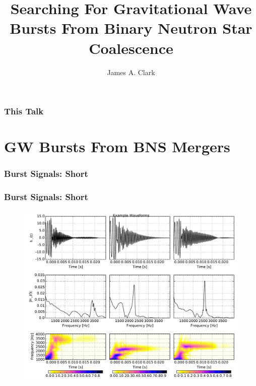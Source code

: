 \documentclass[serif,mathserif]{beamer}
\begin{document}

\title[BNS Bursts]{Searching For Gravitational Wave Bursts From
Binary Neutron Star Coalescence}
\author{James A. Clark}
\date{} 


\begin{frame}[plain]
\titlepage
\end{frame}

\begin{frame}
    \frametitle{This Talk}
    \tableofcontents
\end{frame} 

\section{GW Bursts From BNS Mergers}

\begin{frame}
    \frametitle{Burst Signals: Short}
\end{frame}

\begin{frame}
    \frametitle{Burst Signals: Short}
    \begin{figure}
        \centering
        \includegraphics[width=0.9\columnwidth]{figures/example_waves.pdf}
    \end{figure}
\end{frame}
\end{document}
